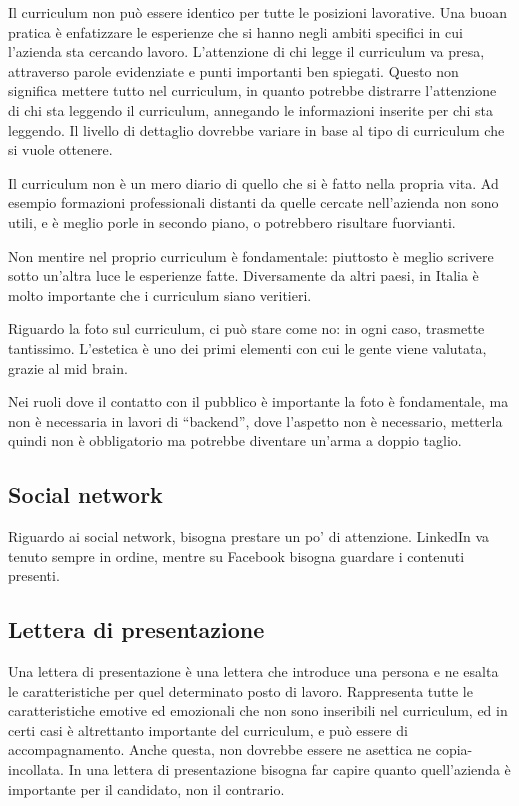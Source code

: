 Il curriculum non può essere identico per tutte le posizioni lavorative. Una
buoan pratica è enfatizzare le esperienze che si hanno negli ambiti specifici
in cui l'azienda sta cercando lavoro. L'attenzione di chi legge il curriculum
va presa, attraverso parole evidenziate e punti importanti ben spiegati. Questo
non significa mettere tutto nel curriculum, in quanto potrebbe distrarre
l'attenzione di chi sta leggendo il curriculum, annegando le informazioni
inserite per chi sta leggendo. Il livello di dettaglio dovrebbe variare in base
al tipo di curriculum che si vuole ottenere.

Il curriculum non è un mero diario di quello che si è fatto nella propria vita.
Ad esempio formazioni professionali distanti da quelle cercate nell'azienda non
sono utili, e è meglio porle in secondo piano, o potrebbero risultare
fuorvianti.

Non mentire nel proprio curriculum è fondamentale: piuttosto è
meglio scrivere sotto un'altra luce le esperienze fatte. Diversamente da altri
paesi, in Italia è molto importante che i curriculum siano veritieri.

Riguardo la foto sul curriculum, ci può stare come no: in ogni caso, trasmette
tantissimo. L'estetica è uno dei primi elementi con cui le gente viene
valutata, grazie al mid brain.

Nei ruoli dove il contatto con il pubblico è importante la foto è fondamentale,
ma non è necessaria in lavori di ``backend'', dove l'aspetto non è necessario,
metterla quindi non è obbligatorio ma potrebbe diventare un'arma a doppio
taglio.

\subsection{Social network}
Riguardo ai social network, bisogna prestare un po' di attenzione. LinkedIn va
tenuto sempre in ordine, mentre su Facebook bisogna guardare i contenuti
presenti.

\subsection{Lettera di presentazione}
Una lettera di presentazione è una lettera che introduce una persona e ne
esalta le caratteristiche per quel determinato posto di lavoro. Rappresenta
tutte le caratteristiche emotive ed emozionali che non sono inseribili nel
curriculum, ed in certi casi è altrettanto importante del curriculum, e
può essere di accompagnamento. Anche questa, non dovrebbe essere ne asettica ne
copia-incollata.
In una lettera di presentazione bisogna far capire quanto quell'azienda è
importante per il candidato, non il contrario.
